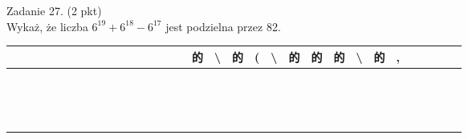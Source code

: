 \documentclass[10pt]{article}
\begin{document}
Zadanie 27. (2 pkt)\\
Wykaż, że liczba \(6^{19}+6^{18}-6^{17}\) jest podzielna przez 82.

\begin{center}
\begin{tabular}{|c|c|c|c|c|c|c|c|c|c|c|c|c|c|c|c|c|c|c|c|c|c|c|c|c|c|c|c|c|c|c|c|}
\hline
 &  &  &  &  &  &  &  &  &  &  &  &  &  &  &  & 的 & \textbackslash  & 的 & ( & \textbackslash  & 的 & 的 & 的 & \textbackslash  & 的 & , &  &  &  &  &  \\
\hline
 &  &  &  &  &  &  &  &  &  &  &  &  &  &  &  &  &  &  &  &  &  &  &  &  &  &  &  &  &  &  &  \\
\hline
 &  &  &  &  &  &  &  &  &  &  &  &  &  &  &  &  &  &  &  &  &  &  &  &  &  &  &  &  &  &  &  \\
\hline
 &  &  &  &  &  &  &  &  &  &  &  &  &  &  &  &  &  &  &  &  &  &  &  &  &  &  &  &  &  &  &  \\
\hline
 &  &  &  &  &  &  &  &  &  &  &  &  &  &  &  &  &  &  &  &  &  &  &  &  &  &  &  &  &  &  &  \\
\hline
 &  &  &  &  &  &  &  &  &  &  &  &  &  &  &  &  &  &  &  &  &  &  &  &  &  &  &  &  &  &  &  \\
\hline
 &  &  &  &  &  &  &  &  &  &  &  &  &  &  &  &  &  &  &  &  &  &  &  &  &  &  &  &  &  &  &  \\
\hline
 &  &  &  &  &  &  &  &  &  &  &  &  &  &  &  &  &  &  &  &  &  &  &  &  &  &  &  &  &  &  &  \\
\hline
 &  &  &  &  &  &  &  &  &  &  &  &  &  &  &  &  &  &  &  &  &  &  &  &  &  &  &  &  &  &  &  \\
\hline
 &  &  &  &  &  &  &  &  &  &  &  &  &  &  &  &  &  &  &  &  &  &  &  &  &  &  &  &  &  &  &  \\
\hline
 &  &  &  &  &  &  &  &  &  &  &  &  &  &  &  &  &  &  &  &  &  &  &  &  &  &  &  &  &  &  &  \\
\hline
 &  &  &  &  &  &  &  &  &  &  &  &  &  &  &  &  &  &  &  &  &  &  &  &  &  &  &  &  &  &  &  \\
\hline
 &  &  &  &  &  &  &  &  &  &  &  &  &  &  &  &  &  &  &  &  &  &  &  &  &  &  &  &  &  &  &  \\
\hline
 &  &  &  &  &  &  &  &  &  &  &  &  &  &  &  &  &  &  &  &  &  &  &  &  &  &  &  &  &  &  &  \\
\hline
 &  &  &  &  &  &  &  &  &  &  &  &  &  &  &  &  &  &  &  &  &  &  &  &  &  &  &  &  &  &  &  \\
\hline
 &  &  &  &  &  &  &  &  &  &  &  &  &  &  &  &  &  &  &  &  &  &  &  &  &  &  &  &  &  &  &  \\

\end{tabular}
\end{center}
\end{document}
